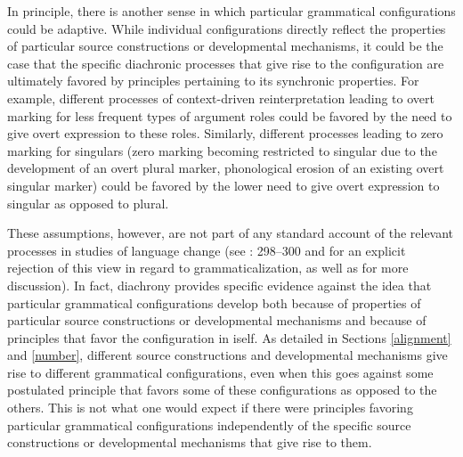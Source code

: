 \documentclass[output=paper]{langsci/langscibook}
\begin{document}
In principle, there is another sense in which particular
grammatical configurations could be adaptive. While individual
configurations directly reflect the properties of particular
source constructions or developmental mechanisms, it could be the case
that the specific diachronic processes that give rise to the configuration are ultimately
favored by principles pertaining to its synchronic properties. For example, different
processes of context-driven reinterpretation leading to overt marking for less frequent
types of argument roles could be favored by the need to
give overt expression to these roles. Similarly, different processes leading to zero
marking for singulars (zero marking
becoming restricted to singular due to the development of an overt plural
marker, phonological erosion of an existing overt singular
marker) could be favored by the lower need to give overt
expression to singular as opposed to plural.

These assumptions, however, 
are not part of any standard account of the relevant processes in
studies of language change (see \citealt{BybeeEtAl1994}: 298--300 and   for an explicit rejection of this view in
regard to grammaticalization, as well as \citealt{Otadependencies} for
more discussion).
In fact, diachrony provides specific evidence against the
idea that particular grammatical configurations develop both
because of properties of particular source constructions or developmental
mechanisms and because of
principles that favor the configuration in iself. As detailed in Sections
\ref{alignment} and \ref{number}, different source constructions and developmental mechanisms
give rise to different grammatical configurations, even when this goes
against some postulated principle that favors some of these
configurations as opposed to the others.
This is not what one would expect if there
were principles favoring particular grammatical
configurations independently of the specific source constructions or
developmental mechanisms that give rise to them.
\end{document}
